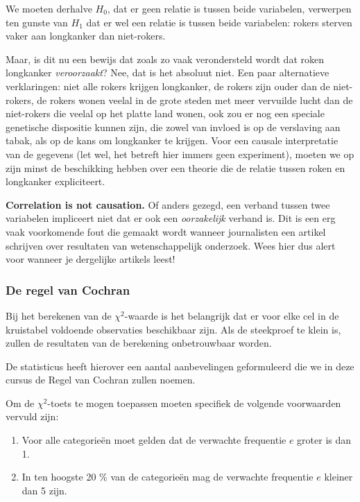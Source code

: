 We moeten derhalve $H_{0}$, dat er geen relatie is tussen beide variabelen, verwerpen ten gunste van $H_{1}$ dat er wel een relatie is tussen beide variabelen: rokers sterven vaker aan longkanker dan niet-rokers.

Maar, is dit nu een bewijs dat zoals zo vaak verondersteld wordt dat roken longkanker \emph{veroorzaakt}? Nee, dat is het absoluut niet. Een paar alternatieve verklaringen: niet alle rokers krijgen longkanker, de rokers zijn ouder dan de niet-rokers, de rokers wonen veelal in de grote steden met meer vervuilde lucht dan de niet-rokers die veelal op het platte land wonen, ook zou er nog een speciale genetische dispositie kunnen zijn, die zowel van invloed is op de verslaving aan tabak, als op de kans om longkanker te krijgen. Voor een causale interpretatie van de gegevens (let wel, het betreft hier immers geen experiment), moeten we op zijn minst de beschikking hebben over een theorie die de relatie tussen roken en longkanker expliciteert.

\begin{remark}[!!]
  \textbf{Correlation is not causation.} Of anders gezegd, een verband tussen twee variabelen impliceert niet dat er ook een \emph{oorzakelijk} verband is. Dit is een erg vaak voorkomende fout die gemaakt wordt wanneer journalisten een artikel schrijven over resultaten van wetenschappelijk onderzoek. Wees hier dus alert voor wanneer je dergelijke artikels leest!
\end{remark}

\subsubsection{De regel van Cochran}

Bij het berekenen van de $\chi^2$-waarde is het belangrijk dat er voor elke cel in de kruistabel voldoende observaties beschikbaar zijn. Als de steekproef te klein is, zullen de resultaten van de berekening onbetrouwbaar worden.

De statisticus \textcite{Cochran1954} heeft hierover een aantal aanbevelingen geformuleerd die we in deze cursus de Regel van Cochran zullen noemen.

Om de $\chi^2$-toets te mogen toepassen moeten specifiek de volgende voorwaarden vervuld zijn:

\begin{enumerate}
  \item Voor alle categorie\"en moet gelden dat de verwachte frequentie $e$ groter is dan 1.
  \item In ten hoogste 20 \% van de categorie\"en mag de verwachte frequentie $e$ kleiner dan 5 zijn.
\end{enumerate}

